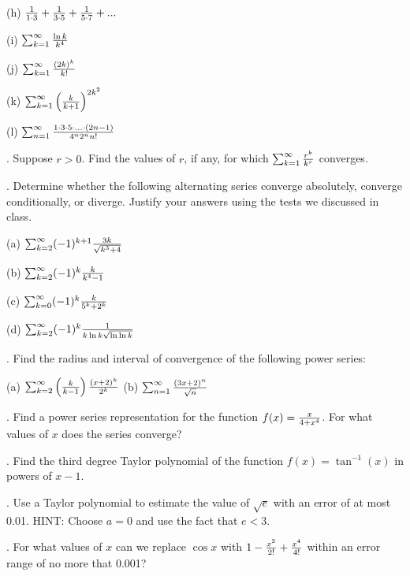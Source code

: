 \documentclass[12pt]{article}
\begin{document}
\smallskip
\noindent (h) ${{1}\over{1 \cdot 3}} + {{1}\over{3 \cdot 5}} + 
{{1}\over{5 \cdot 7}} + ...$

\smallskip
\noindent (i) $\sum_{k=1}^{\infty} {{\ln k}\over{k^4}}$

\smallskip
\noindent (j) $\sum_{k=1}^{\infty} {{(2k)^k}\over{k!}}$

\smallskip
\noindent (k) $\sum_{k=1}^{\infty} \left ( {{k}\over{k+1}} \right 
)^{2k^2}$

\smallskip
\noindent (l) $\sum_{n=1}^{\infty} {{1 \cdot 3 \cdot 5 \cdot ... \cdot 
(2n-1)}\over{4^n 2^n n!}}$

\medskip
{}.   Suppose $r > 0$.  Find the values of $r$, if any, 
for which $\sum_{k=1}^{\infty} {{r^k}\over{k^r}}$ converges.

\medskip
{}.  Determine whether the following alternating series
converge absolutely, converge conditionally, or diverge.  Justify your
answers using the tests we discussed in class.

\noindent (a)  $\sum_{k=2}^{\infty} (-1)^{k+1} 
{{3k}\over{\sqrt{k^3+4}}}$

\smallskip
\noindent (b)  $\sum_{k=2}^{\infty} (-1)^k {{k}\over{k^4-1}}$

\smallskip
\noindent (c)  $\sum_{k=0}^{\infty} (-1)^{k} {{k}\over{5^k+2^k}}$

\smallskip
\noindent (d)  $\sum_{k=2}^{\infty} (-1)^k {{1}\over{k \ln k \sqrt{\ln 
\ln k}}}$

\medskip
{}.  Find the radius and interval of convergence of the following 
power series:

\noindent (a)  $\sum_{k=2}^{\infty} \left ( {{k}\over{k-1}} \right ) 
{{(x+2)^k}\over{2^k}}$
\smallskip
\noindent (b) $\sum_{n=1}^{\infty} {{(3x+2)^n}\over{\sqrt{n}}}$

\medskip
{}.  Find a power series representation for the 
function $f(x)={{x}\over{4+x^4}}$.  For what values of $x$ does the series 
converge?

\medskip
{}.  Find the third degree Taylor polynomial of the function
$f(x)=\tan^{-1}(x)$ in powers of $x-1$.

\medskip
{}.  Use a Taylor polynomial to estimate the value of $\sqrt{e}$ 
with an error of at most 0.01.  HINT: Choose $a=0$ and use the fact that 
$e<3$.

\medskip
{}.  For what values of $x$ can we replace $\cos x$ with $1 - 
{{x^2}\over{2!}} + {{x^4}\over{4!}}$ within an error range of no more 
that 0.001? 
\end{document}
